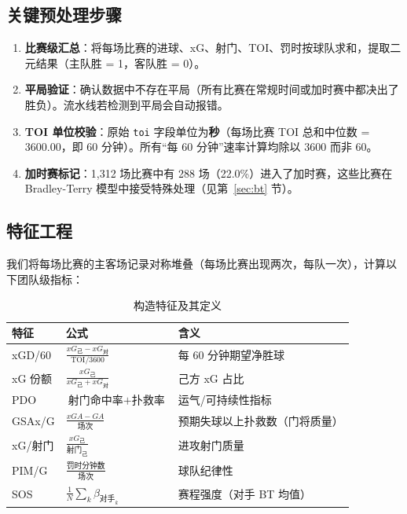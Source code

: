 \documentclass[11pt, a4paper]{article}
\begin{document}
\subsection{关键预处理步骤}

\begin{enumerate}
    \item \textbf{比赛级汇总}：将每场比赛的进球、xG、射门、TOI、罚时按球队求和，提取二元结果（主队胜 = 1，客队胜 = 0）。
    \item \textbf{平局验证}：确认数据中不存在平局（所有比赛在常规时间或加时赛中都决出了胜负）。流水线若检测到平局会自动报错。
    \item \textbf{TOI 单位校验}：原始 \texttt{toi} 字段单位为\textbf{秒}（每场比赛 TOI 总和中位数 = 3600.00，即 60 分钟）。所有``每 60 分钟''速率计算均除以 3600 而非 60。
    \item \textbf{加时赛标记}：1,312 场比赛中有 288 场（22.0\%）进入了加时赛，这些比赛在 Bradley-Terry 模型中接受特殊处理（见第~\ref{sec:bt} 节）。
\end{enumerate}

\subsection{特征工程}

我们将每场比赛的主客场记录对称堆叠（每场比赛出现两次，每队一次），计算以下团队级指标：

\begin{table}[H]
\centering
\caption{构造特征及其定义}
\label{tab:features}
\begin{tabular}{lll}
\toprule
\textbf{特征} & \textbf{公式} & \textbf{含义} \\
\midrule
xGD/60 & $\displaystyle\frac{xG_{\text{己}} - xG_{\text{对}}}{\text{TOI} / 3600}$ & 每 60 分钟期望净胜球 \\[8pt]
xG 份额 & $\displaystyle\frac{xG_{\text{己}}}{xG_{\text{己}} + xG_{\text{对}}}$ & 己方 xG 占比 \\[8pt]
PDO & $\text{射门命中率} + \text{扑救率}$ & 运气/可持续性指标 \\[4pt]
GSAx/G & $\displaystyle\frac{xGA - GA}{\text{场次}}$ & 预期失球以上扑救数（门将质量） \\[8pt]
xG/射门 & $\displaystyle\frac{xG_{\text{己}}}{\text{射门}_{\text{己}}}$ & 进攻射门质量 \\[8pt]
PIM/G & $\displaystyle\frac{\text{罚时分钟数}}{\text{场次}}$ & 球队纪律性 \\[4pt]
SOS & $\displaystyle\frac{1}{N}\sum_{k} \beta_{\text{对手}_k}$ & 赛程强度（对手 BT 均值） \\
\bottomrule
\end{tabular}
\end{table}
\end{document}
